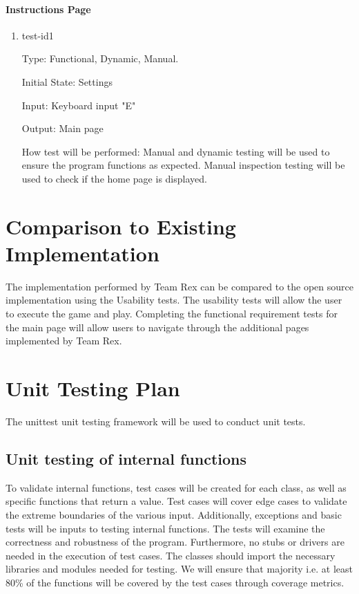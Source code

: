 \documentclass[12pt, titlepage]{article}
\begin{document}
\paragraph{Instructions Page}

\begin{enumerate}
	
	\item{test-id1\\}
	
	Type: Functional, Dynamic, Manual.
	
	Initial State: Settings 
	
	Input: Keyboard input "E"
	
	Output: Main page
	
	How test will be performed: Manual and dynamic testing will be used to ensure the program functions as expected. Manual inspection testing will be used to check if the home page is displayed. 
	
\end{enumerate}

\section{Comparison to Existing Implementation}	
The implementation performed by Team Rex can be compared to the open source implementation using the Usability tests. The usability tests will allow the user to execute the game and play. Completing the functional requirement tests for the main page will allow users to navigate through the additional pages implemented by Team Rex. 

				
\section{Unit Testing Plan}


The unittest unit testing framework will be used to conduct unit tests.
		
\subsection{Unit testing of internal functions}

	
To validate internal functions, test cases will be created for each class, as well as specific functions that return a value. Test cases will cover edge cases to validate the extreme boundaries of the various input. Additionally, exceptions and basic tests will be inputs to testing internal functions. The tests will examine the correctness and robustness of the program.  Furthermore, no stubs or drivers are needed in the execution of test cases. The classes should import the necessary libraries and modules needed for testing. We will ensure that majority {i.e. at least 80\%} of the functions will be covered by the test cases through coverage metrics. 
\end{document}
